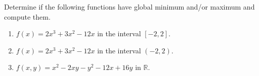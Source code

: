 \documentclass[11.0pt]{exam}
\begin{document}
\begin{questions}


\question[3] Determine if the following functions have global minimum and/or maximum and compute them.
\begin{enumerate}
    \item $f(x)=2x^{3}+3x^2-12x$ in the interval $[-2,2]$.
    \item $f(x)=2x^{3}+3x^2-12x$ in the interval $(-2,2)$.
    \item $f(x,y)=x^2-2xy-y^2-12x+16y$ in $\mathbb{R}$.
\end{enumerate}


\end{questions}
\end{document}
